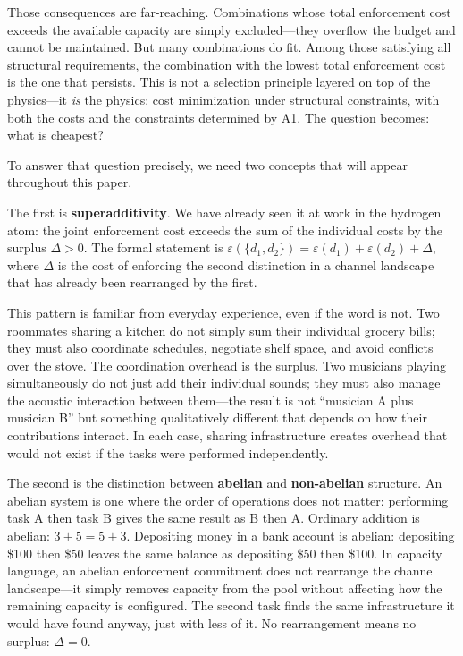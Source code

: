 \documentclass[11pt]{article}
\begin{document}
Those consequences are far-reaching.  Combinations whose total enforcement cost exceeds the available capacity are simply excluded---they overflow the budget and cannot be maintained.  But many combinations do fit.  Among those satisfying all structural requirements, the combination with the lowest total enforcement cost is the one that persists.  This is not a selection principle layered on top of the physics---it \emph{is} the physics: cost minimization under structural constraints, with both the costs and the constraints determined by A1.  The question becomes: what is cheapest?

To answer that question precisely, we need two concepts that will appear throughout this paper.

The first is \textbf{superadditivity}.  We have already seen it at work in the hydrogen atom: the joint enforcement cost exceeds the sum of the individual costs by the surplus $\Delta > 0$.  The formal statement is $\varepsilon(\{d_1, d_2\}) = \varepsilon(d_1) + \varepsilon(d_2) + \Delta$, where $\Delta$ is the cost of enforcing the second distinction in a channel landscape that has already been rearranged by the first.

This pattern is familiar from everyday experience, even if the word is not.  Two roommates sharing a kitchen do not simply sum their individual grocery bills; they must also coordinate schedules, negotiate shelf space, and avoid conflicts over the stove.  The coordination overhead is the surplus.  Two musicians playing simultaneously do not just add their individual sounds; they must also manage the acoustic interaction between them---the result is not ``musician A plus musician B'' but something qualitatively different that depends on how their contributions interact.  In each case, sharing infrastructure creates overhead that would not exist if the tasks were performed independently.

The second is the distinction between \textbf{abelian} and \textbf{non-abelian} structure.  An abelian system is one where the order of operations does not matter: performing task A then task B gives the same result as B then A.  Ordinary addition is abelian: $3 + 5 = 5 + 3$.  Depositing money in a bank account is abelian: depositing \$100 then \$50 leaves the same balance as depositing \$50 then \$100.  In capacity language, an abelian enforcement commitment does not rearrange the channel landscape---it simply removes capacity from the pool without affecting how the remaining capacity is configured.  The second task finds the same infrastructure it would have found anyway, just with less of it.  No rearrangement means no surplus: $\Delta = 0$.
\end{document}
